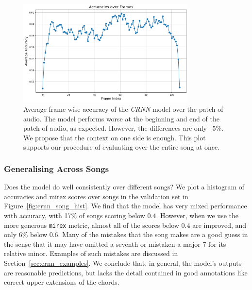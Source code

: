\begin{figure}[H]
    \centering
    \includegraphics[width=0.8\textwidth]{figures/accuracy_over_frames.png}
    \caption{Average frame-wise accuracy of the \emph{CRNN} model over the patch of audio. The model performs worse at the beginning and end of the patch of audio, as expected. However, the differences are only ~5\%. We propose that the context on one side is enough. This plot supports our procedure of evaluating over the entire song at once. }\label{fig:crnn_context}
\end{figure}

\subsubsection{Generalising Across Songs}

Does the model do well consistently over different songs? We plot a histogram of accuracies and mirex scores over songs in the validation set in Figure~\ref{fig:crnn_song_hist}. We find that the model has very mixed performance with accuracy, with 17\% of songs scoring below $0.4$. However, when we use the more generous \texttt{mirex} metric, almost all of the scores below $0.4$ are improved, and only 6\% below 0.6. Many of the mistakes that the song makes are a good guess in the sense that it may have omitted a seventh or mistaken a major 7 for its relative minor. Examples of such mistakes are discussed in Section~\ref{sec:crnn_examples}. We conclude that, in general, the model's outputs are reasonable predictions, but lacks the detail contained in good annotations like correct upper extensions of the chords.

